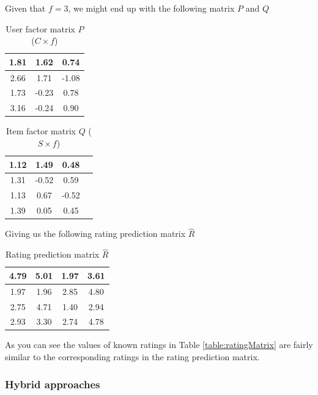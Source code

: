 Given that $f = 3$, we might end up with the following matrix $P$ and $Q$

\begin{table}[!htbp]
\centering
\begin{tabular}{|c|c|c|}
\hline
1.81    &1.62   &0.74\\ \hline
2.66    &1.71   &-1.08\\ \hline
1.73    &-0.23  &0.78\\ \hline
3.16    &-0.24  &0.90\\ \hline
\end{tabular}
\label{table:ItemFeature}
\caption{User factor matrix $P$ ($C \times f$)}
\end{table}

\begin{table}[!htbp]
\centering
\begin{tabular}{|c|c|c|c|}
\hline
1.12    &   1.49    &   0.48\\ \hline
1.31    &-0.52  &0.59\\ \hline
1.13    &0.67&  -0.52\\ \hline
1.39    &0.05&  0.45\\ \hline
\end{tabular}
\label{table:UserFeature}
\caption{Item factor matrix $Q$ ($S \times f$)}
\end{table}

Giving us the following rating prediction matrix $\hat{R}$

\begin{table}[!htbp]
\centering
\begin{tabular}{|c|c|c|c|}
\hline
4.79    &5.01   &1.97   &3.61 \\ \hline
1.97    &1.96   &2.85   &4.80 \\ \hline
2.75    &4.71   &1.40   &2.94 \\ \hline
2.93    &3.30   &2.74   &4.78 \\ \hline
\end{tabular}
\label{table:PredictionMatrix}
\caption{Rating prediction matrix $\hat{R}$}
\end{table}

As you can see the values of known ratings in Table \ref{table:ratingMatrix} are fairly similar to the corresponding ratings in the rating prediction matrix.

\subsubsection{Hybrid approaches}

